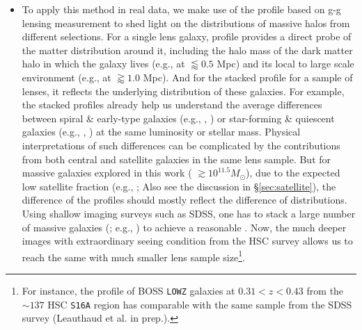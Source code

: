 \documentclass[fleqn,usenatbib,useAMS,english]{mnras}
\begin{document}
\begin{itemize}
        \item To apply this method in real data, we make use of the \dsigma{} profile based on 
            g-g lensing measurement to shed light on the \mvir{} distributions of massive 
            halos from different selections.
            For a single lens galaxy, \dsigma{} profile provides a direct probe of the 
            matter distribution around it, including the halo mass of the dark matter halo 
            in which the galaxy lives (e.g., at $\lessapprox 0.5$ Mpc)
            and its local to large scale environment (e.g., at $\gtrapprox 1.0$ Mpc).
            And for the stacked \dsigma{} profile for a sample of lenses, it reflects the 
            underlying \mvir{} distribution of these galaxies.
            For example, the stacked \dsigma{} profiles already help us understand the 
            average \mvir{} differences between spiral \& early-type galaxies 
            (e.g., \citealt{Mandelbaum2006a}, \addref{}) or star-forming \& quiescent galaxies 
            (e.g., \citealt{Mandelbaum2016}, \addref{}) at the same luminosity or stellar mass.
            Physical interpretations of such differences can be complicated by the
            contributions from both central and satellite galaxies in the same lens sample.
            But for massive galaxies explored in this work (\mstar{} $\gtrsim 10^{11.5} M_{\odot}$),
            due to the expected low satellite fraction 
            (e.g., \citealt{Mandelbaum2006a, vanUitert2016}; \addref{} Also see the discussion 
            in \S \ref{sec:satellite}), the difference of the \dsigma{} profiles should mostly 
            reflect the difference of \mvir{} distributions.
            Using shallow imaging surveys such as SDSS, one has to stack a large number of
            massive galaxies (; e.g., \citealt{Mandelbaum2006a}) to
            achieve a reasonable \snratio{}.
            Now, the much deeper images with extraordinary seeing condition from the HSC survey 
            allows us to reach the same \snratio{} with much smaller lens sample size\footnote{
            For instance, the \dsigma{} profile of BOSS \texttt{LOWZ} galaxies at $0.31 < z <
            0.43$ from the $\sim 137$ \sqdeg{} HSC \texttt{S16A} region has comparable \snratio{}
            with the same sample from the  \sqdeg{} SDSS survey (Leauthaud et al. in
            prep.).}.


\end{itemize}
\end{document}
